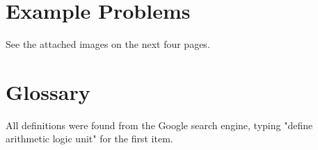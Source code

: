 \documentclass[12pt]{article}
\begin{document}
\section{Example Problems}

See the attached images on the next four pages.

% 

\section{Glossary}

All definitions were found from the Google search engine, typing "define arithmetic logic unit" for the first item.
\end{document}
